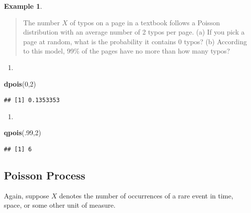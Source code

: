 \documentclass[
]{book}
\newenvironment{Shaded}{\begin{snugshade}}{\end{snugshade}}
\newcommand{\DecValTok}[1]{\textcolor[rgb]{0.00,0.00,0.81}{#1}}
\newcommand{\FunctionTok}[1]{\textcolor[rgb]{0.13,0.29,0.53}{\textbf{#1}}}
\newcommand{\NormalTok}[1]{#1}
\providecommand{\tightlist}{%
  \setlength{\itemsep}{0pt}\setlength{\parskip}{0pt}}
\theoremstyle{definition}
\theoremstyle{definition}
\newtheorem{example}{Example}[chapter]
\theoremstyle{definition}
\theoremstyle{definition}
\theoremstyle{remark}
\begin{document}
\begin{example}
\protect\hypertarget{exm:pois-typos-R}{}\label{exm:pois-typos-R}\leavevmode

\begin{quote}
The number \(X\) of typos on a page in a textbook follows a Poisson distribution with an average number of 2 typos per page. (a) If you pick a page at random, what is the probability it contains 0 typos? (b) According to this model, 99\% of the pages have no more than how many typos?
\end{quote}

\begin{enumerate}
\def\labelenumi{(\alph{enumi})}
\tightlist
\item
\end{enumerate}

\begin{Shaded}
\begin{Highlighting}[]
\FunctionTok{dpois}\NormalTok{(}\DecValTok{0}\NormalTok{,}\DecValTok{2}\NormalTok{)}
\end{Highlighting}
\end{Shaded}

\begin{verbatim}
## [1] 0.1353353
\end{verbatim}

\begin{enumerate}
\def\labelenumi{(\alph{enumi})}
\setcounter{enumi}{1}
\tightlist
\item
\end{enumerate}

\begin{Shaded}
\begin{Highlighting}[]
\FunctionTok{qpois}\NormalTok{(.}\DecValTok{99}\NormalTok{,}\DecValTok{2}\NormalTok{)}
\end{Highlighting}
\end{Shaded}

\begin{verbatim}
## [1] 6
\end{verbatim}

\end{example}

\subsection*{Poisson Process}\label{poisson-process-1}

Again, suppose \(X\) denotes the number of occurrences of a rare event in time, space, or some other unit of measure.
\end{document}
